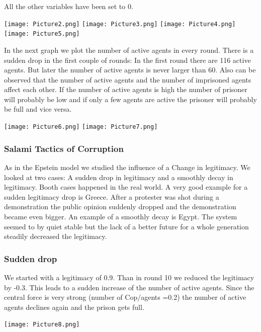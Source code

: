 \documentclass[11pt]{article}
\begin{document}
All the other variables have been set to 0.\newline

\texttt{[image: Picture2.png]}\newline
\texttt{[image: Picture3.png]}\newline
\texttt{[image: Picture4.png]}\newline
\texttt{[image: Picture5.png]}\newpage

In the next graph we plot the number of active agents in every round. There is a sudden drop in the first couple of rounds: In the first round there are 116 active agents. But later the number of active agents is never larger than 60. Also can be observed that the number of active agents and the number of imprisoned agents affect each other. If the number of active agents is high the number of prisoner will probably be low and if only a few agents are active the prisoner will probably be full and vice versa.\newline

\texttt{[image: Picture6.png]}\newline
\texttt{[image: Picture7.png]}

\subsubsection{Salami Tactics of Corruption}
As in the Epstein model we studied the influence of a Change in legitimacy. We looked at two cases: A sudden drop in legitimacy and a smoothly decay in legitimacy. Booth cases happened in the real world. A very good example for a sudden legitimacy drop is Greece. After a protester was shot during a demonstration the public opinion suddenly dropped and the demonstration became even bigger.  An example of a smoothly decay is Egypt. The system seemed to by quiet stable but the lack of a better future for a whole generation steadily decreased the legitimacy.\newline

\subsubsection{Sudden drop}
We started with a legitimacy of 0.9.  Than in round 10 we reduced the legitimacy by -0.3.  This leads to a sudden increase of the number of active agents. Since the central force is very strong (number of Cop/agents =0.2) the number of active agents declines again and the prison gets full.

\texttt{[image: Picture8.png]}
\end{document}
